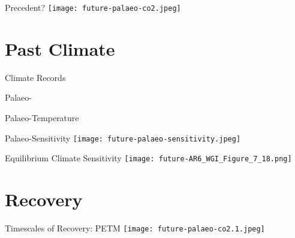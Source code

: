 \documentclass[aspectratio=169]{beamer}
\begin{document}
\begin{frame}{Precedent?}
    \centering
    \texttt{[image: future-palaeo-co2.jpeg]}
\end{frame}            

\section{Past Climate}

\begin{frame}{Climate Records}
\end{frame}

\begin{frame}{Palaeo-}
\end{frame}

\begin{frame}{Palaeo-Temperature}
\end{frame}

\begin{frame}{Palaeo-Sensitivity}
    \texttt{[image: future-palaeo-sensitivity.jpeg]}
\end{frame}

\begin{frame}{Equilibrium Climate Sensitivity}
    \centering
    \texttt{[image: future-AR6\_WGI\_Figure\_7\_18.png]}

\end{frame}

\section{Recovery}

\begin{frame}{Timescales of Recovery: PETM}
    \centering
    \texttt{[image: future-palaeo-co2.1.jpeg]}
\end{frame}
\end{document}
